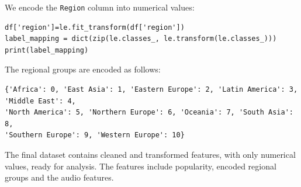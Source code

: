 We encode the \texttt{Region} column into numerical values:

\begin{verbatim}
df['region']=le.fit_transform(df['region'])
label_mapping = dict(zip(le.classes_, le.transform(le.classes_)))
print(label_mapping)
\end{verbatim}

The regional groups are encoded as follows:
\begin{verbatim}
{'Africa': 0, 'East Asia': 1, 'Eastern Europe': 2, 'Latin America': 3, 'Middle East': 4, 
'North America': 5, 'Northern Europe': 6, 'Oceania': 7, 'South Asia': 8, 
'Southern Europe': 9, 'Western Europe': 10}
\end{verbatim}




The final dataset contains cleaned and transformed features, with only numerical values, ready for analysis. The features include popularity, encoded regional groups and the audio features.

